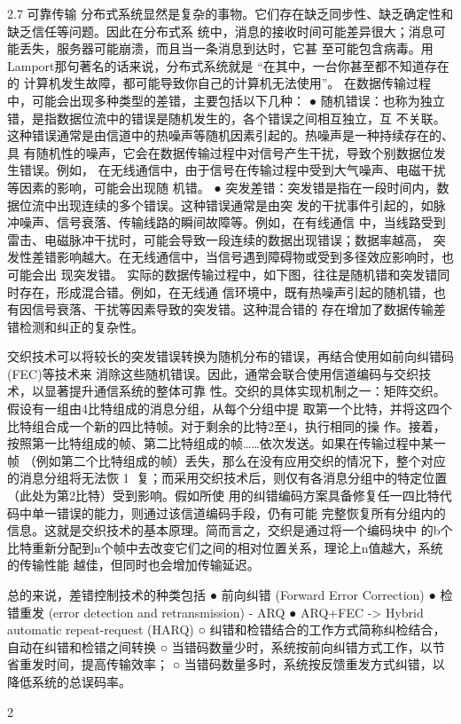 
2.7 可靠传输
分布式系统显然是复杂的事物。它们存在缺乏同步性、缺乏确定性和缺乏信任等问题。因此在分布式系
统中，消息的接收时间可能差异很大；消息可能丢失，服务器可能崩溃，而且当一条消息到达时，它甚
至可能包含病毒。用Lamport那句著名的话来说，分布式系统就是 “在其中，一台你甚至都不知道存在的
计算机发生故障，都可能导致你自己的计算机无法使用”。
在数据传输过程中，可能会出现多种类型的差错，主要包括以下几种：
 ● 随机错误：也称为独立错，是指数据位流中的错误是随机发生的，各个错误之间相互独立，互
   不关联。这种错误通常是由信道中的热噪声等随机因素引起的。热噪声是一种持续存在的、具
   有随机性的噪声，它会在数据传输过程中对信号产生干扰，导致个别数据位发生错误。例如，
   在无线通信中，由于信号在传输过程中受到大气噪声、电磁干扰等因素的影响，可能会出现随
   机错。
 ● 突发差错：突发错是指在一段时间内，数据位流中出现连续的多个错误。这种错误通常是由突
   发的干扰事件引起的，如脉冲噪声、信号衰落、传输线路的瞬间故障等。例如，在有线通信
   中，当线路受到雷击、电磁脉冲干扰时，可能会导致一段连续的数据出现错误；数据率越高，
   突发性差错影响越大。在无线通信中，当信号遇到障碍物或受到多径效应影响时，也可能会出
   现突发错。
实际的数据传输过程中，如下图，往往是随机错和突发错同时存在，形成混合错。例如，在无线通
信环境中，既有热噪声引起的随机错，也有因信号衰落、干扰等因素导致的突发错。这种混合错的
存在增加了数据传输差错检测和纠正的复杂性。




交织技术可以将较长的突发错误转换为随机分布的错误，再结合使用如前向纠错码(FEC)等技术来
消除这些随机错误。因此，通常会联合使用信道编码与交织技术，以显著提升通信系统的整体可靠
性。交织的具体实现机制之一：矩阵交织。假设有一组由4比特组成的消息分组，从每个分组中提
取第一个比特，并将这四个比特组合成一个新的四比特帧。对于剩余的比特2至4，执行相同的操
作。接着，按照第一比特组成的帧、第二比特组成的帧……依次发送。如果在传输过程中某一帧
（例如第二个比特组成的帧）丢失，那么在没有应用交织的情况下，整个对应的消息分组将无法恢
                                                 1
复；而采用交织技术后，则仅有各消息分组中的特定位置（此处为第2比特）受到影响。假如所使
用的纠错编码方案具备修复任一四比特代码中单一错误的能力，则通过该信道编码手段，仍有可能
完整恢复所有分组内的信息。这就是交织技术的基本原理。简而言之，交织是通过将一个编码块中
的b个比特重新分配到n个帧中去改变它们之间的相对位置关系，理论上n值越大，系统的传输性能
越佳，但同时也会增加传输延迟。




总的来说，差错控制技术的种类包括
 ● 前向纠错 (Forward Error Correction)
 ● 检错重发 (error detection and retransmission) - ARQ
 ● ARQ+FEC -> Hybrid automatic repeat-request (HARQ)
    ○ 纠错和检错结合的工作方式简称纠检结合，自动在纠错和检错之间转换
    ○ 当错码数量少时，系统按前向纠错方式工作，以节省重发时间，提高传输效率；
    ○ 当错码数量多时，系统按反馈重发方式纠错，以降低系统的总误码率。




                                                       2

